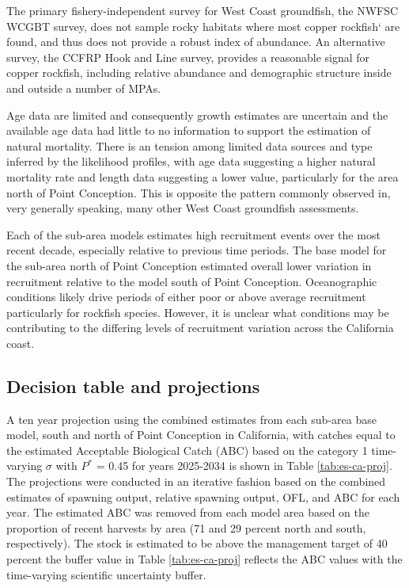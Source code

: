 \documentclass[11pt,
  english,
  letterpaper,
]{article}
\begin{document}
The primary fishery-independent survey for West Coast groundfish, the NWFSC WCGBT survey, does not sample rocky habitats where most copper rockfish` are found, and thus does not provide a robust index of abundance. An alternative survey, the CCFRP Hook and Line survey, provides a reasonable signal for copper rockfish, including relative abundance and demographic structure inside and outside a number of MPAs.

Age data are limited and consequently growth estimates are uncertain and the available age data had little to no information to support the estimation of natural mortality. There is an tension among limited data sources and type inferred by the likelihood profiles, with age data suggesting a higher natural mortality rate and length data suggesting a lower value, particularly for the area north of Point Conception. This is opposite the pattern commonly observed in, very generally speaking, many other West Coast groundfish assessments.

Each of the sub-area models estimates high recruitment events over the most recent decade, especially relative to previous time periods. The base model for the sub-area north of Point Conception estimated overall lower variation in recruitment relative to the model south of Point Conception. Oceanographic conditions likely drive periods of either poor or above average recruitment particularly for rockfish species. However, it is unclear what conditions may be contributing to the differing levels of recruitment variation across the California coast.

\hypertarget{decision-table-and-projections}{%
\subsection*{Decision table and projections}\label{decision-table-and-projections}}

A ten year projection using the combined estimates from each sub-area base model, south and north of Point Conception in California, with catches equal to the estimated Acceptable Biological Catch (ABC) based on the category 1 time-varying \(\sigma\) with \(P^*\) = 0.45 for years 2025-2034 is shown in Table \ref{tab:es-ca-proj}. The projections were conducted in an iterative fashion based on the combined estimates of spawning output, relative spawning output, OFL, and ABC for each year. The estimated ABC was removed from each model area based on the proportion of recent harvests by area (71 and 29 percent north and south, respectively). The stock is estimated to be above the management target of 40 percent the buffer value in Table \ref{tab:es-ca-proj} reflects the ABC values with the time-varying scientific uncertainty buffer.
\end{document}
